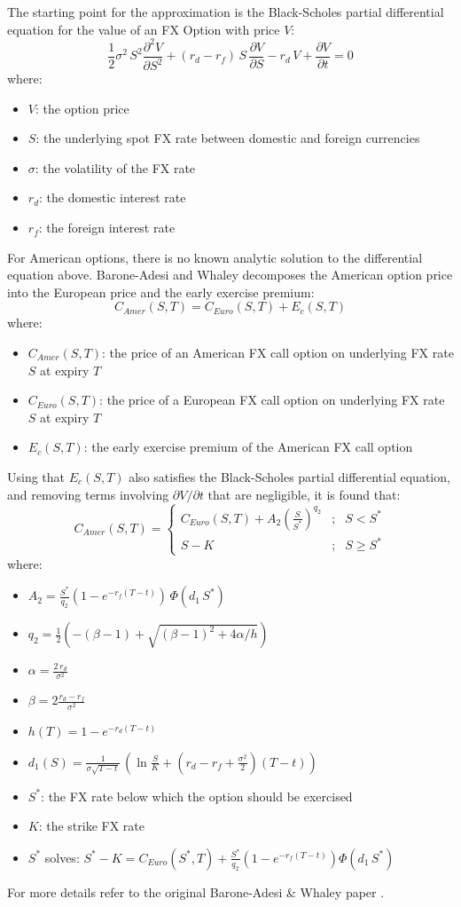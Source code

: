 The starting point for the approximation is the Black-Scholes partial differential 
equation for the value of an FX Option with price $V$:
$$
\frac{1}{2} \sigma^2\, S^2 \frac{\partial^2 V}{\partial S^2} + 
(r_d -r_f)\, S\, \frac{\partial V}{\partial S} - r_d\, V
+\frac{\partial V}{\partial t} = 0
$$
where:
\begin{itemize}
\item $V$: the option price
\item $S$: the underlying spot FX rate between domestic and foreign currencies
\item $\sigma$: the volatility of the FX rate
\item $r_d$: the domestic interest rate
\item $r_f$: the foreign interest rate
\end{itemize}

For American options, there is no known analytic solution to the differential equation 
above. Barone-Adesi and Whaley decomposes the American option price into the European 
price and the early exercise premium:
$$
C_{Amer} (S,T)= C_{Euro} (S,T) + E_c (S,T)
$$
where:
\begin{itemize}
\item $C_{Amer} (S,T)$: the price of an American FX call option on underlying FX 
rate $S$ at expiry $T$
\item $C_{Euro} (S,T)$: the price of a European FX call option on underlying FX 
rate $S$ at expiry $T$
\item $E_c (S,T)$: the early exercise premium of the American FX call option
\end{itemize}

Using that $E_c (S,T)$ also satisfies the Black-Scholes partial differential equation, 
and removing terms involving $\partial V / \partial t$ that are negligible, it is found 
that:
$$
C_{Amer} (S,T)=\left\{ \begin{array}{lcl}
C_{Euro}(S,T) + A_2\left(\frac{S}{S^*}\right)^{q_2} &;& S < S^*\\
S-K &;& S\geq S^* 
\end{array}
\right.
$$
where:
\begin{itemize}
\item $\displaystyle A_2=\frac{S^*}{q_2} \left(1-e^{-r_f (T-t)}\right)\,\Phi(d_1\,S^*)$
\item $\displaystyle q_2=\frac{1}{2}\left(-(\beta-1)+\sqrt{(\beta-1)^2+4\alpha/h}\right)$
\item $\displaystyle \alpha =\frac{2\,r_d}{\sigma^2}$ 
\item $\displaystyle \beta=2\frac{r_d-r_f}{\sigma^2}$ 
\item $\displaystyle h(T)=1-e^{-r_d (T-t)}$
\item $\displaystyle d_1(S)=\frac{1}{\sigma\sqrt{T-t}}\,
	\left(\ln\frac{S}{K}+\left(r_d - r_f + \frac{\sigma^2}{2}\right)(T-t)\right)$
\item $S^*$: the FX rate below which the option should be exercised
\item $K$: the strike FX rate
\item $S^*$ solves:
$\displaystyle S^*-K = C_{Euro}(S^*,T) + \frac{S^*}{q_2}  \left(1-e^{-r_f (T-t)}\right) \Phi(d_1 \,S^*)$
\end{itemize}

For more details refer to the original Barone-Adesi \& Whaley paper \cite{Barone-Adesi_1987}.

